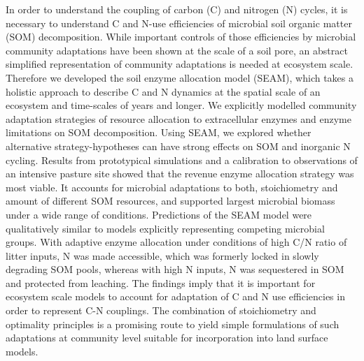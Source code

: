 In order to understand the coupling of carbon (C) and nitrogen (N) cycles, it is
necessary to understand C and N-use efficiencies of microbial soil organic
matter (SOM) decomposition. While important controls of those efficiencies by
microbial community adaptations have been shown at the scale of a soil pore, an
abstract simplified representation of community adaptations is needed at
ecosystem scale.
Therefore we developed the soil enzyme allocation model (SEAM), which takes a
holistic approach to describe C and N dynamics at the spatial scale of an
ecosystem and time-scales of years and longer.
We explicitly modelled community adaptation strategies of resource allocation to
extracellular enzymes and enzyme limitations on SOM decomposition. Using SEAM,
we explored whether alternative strategy-hypotheses can have strong effects on
SOM and inorganic N cycling.
Results from prototypical simulations and a calibration to observations of an
intensive pasture site showed that the revenue enzyme allocation strategy was
most viable. It accounts for microbial adaptations to both, stoichiometry and
amount of different SOM resources, and supported largest microbial biomass under
a wide range of conditions.
Predictions of the SEAM model were qualitatively similar to models explicitly
representing competing microbial groups. With adaptive enzyme allocation
under conditions of high C/N ratio of litter inputs, N was made
accessible, which was formerly locked in slowly degrading SOM pools, whereas
with high N inputs, N was sequestered in SOM and protected from leaching.
The findings imply that it is important for ecosystem scale models to account
for adaptation of C and N use efficiencies in order to represent C-N couplings.
The combination of stoichiometry and optimality principles is a promising route
to yield simple formulations of such adaptations at community level suitable for
incorporation into land surface models.
